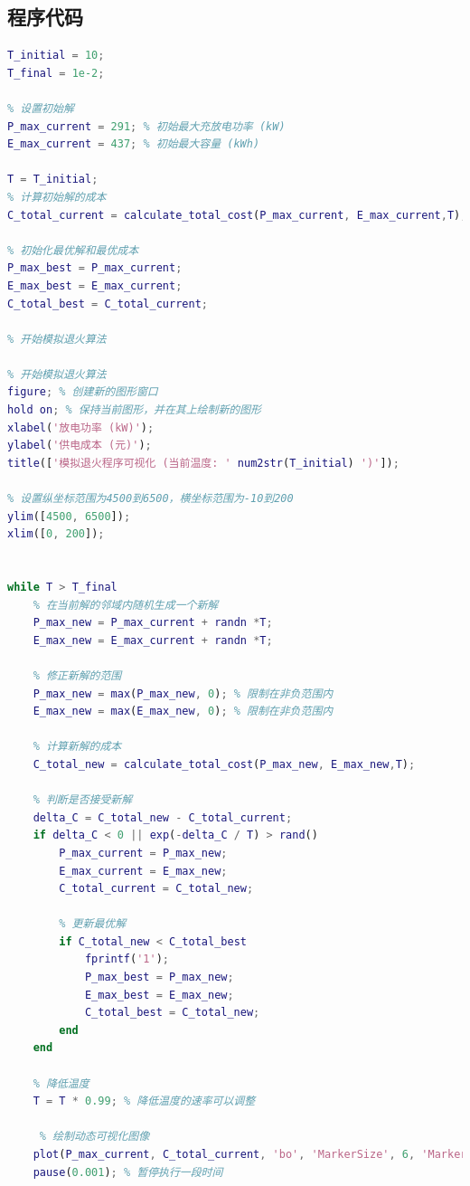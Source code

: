 \documentclass{cumcmthesis}
\begin{document}
\newpage
\begin{appendices}
\section{程序代码}		
\begin{lstlisting}[language=Matlab]
% 设置初始温度和终止温度
T_initial = 10;
T_final = 1e-2;

% 设置初始解
P_max_current = 291; % 初始最大充放电功率 (kW)
E_max_current = 437; % 初始最大容量 (kWh)

T = T_initial;
% 计算初始解的成本
C_total_current = calculate_total_cost(P_max_current, E_max_current,T);

% 初始化最优解和最优成本
P_max_best = P_max_current;
E_max_best = E_max_current;
C_total_best = C_total_current;

% 开始模拟退火算法

% 开始模拟退火算法
figure; % 创建新的图形窗口
hold on; % 保持当前图形，并在其上绘制新的图形
xlabel('放电功率 (kW)');
ylabel('供电成本 (元)');
title(['模拟退火程序可视化 (当前温度: ' num2str(T_initial) ')']);

% 设置纵坐标范围为4500到6500，横坐标范围为-10到200
ylim([4500, 6500]);
xlim([0, 200]);


while T > T_final
    % 在当前解的邻域内随机生成一个新解
    P_max_new = P_max_current + randn *T;
    E_max_new = E_max_current + randn *T;
    
    % 修正新解的范围
    P_max_new = max(P_max_new, 0); % 限制在非负范围内
    E_max_new = max(E_max_new, 0); % 限制在非负范围内
    
    % 计算新解的成本
    C_total_new = calculate_total_cost(P_max_new, E_max_new,T);
    
    % 判断是否接受新解
    delta_C = C_total_new - C_total_current;
    if delta_C < 0 || exp(-delta_C / T) > rand()
        P_max_current = P_max_new;
        E_max_current = E_max_new;
        C_total_current = C_total_new;
        
        % 更新最优解
        if C_total_new < C_total_best
            fprintf('1');
            P_max_best = P_max_new;
            E_max_best = E_max_new;
            C_total_best = C_total_new;
        end
    end
    
    % 降低温度
    T = T * 0.99; % 降低温度的速率可以调整
    
     % 绘制动态可视化图像
    plot(P_max_current, C_total_current, 'bo', 'MarkerSize', 6, 'MarkerFaceColor', 'b');
    pause(0.001); % 暂停执行一段时间
    

\end{lstlisting}
\end{appendices}
\end{document}
